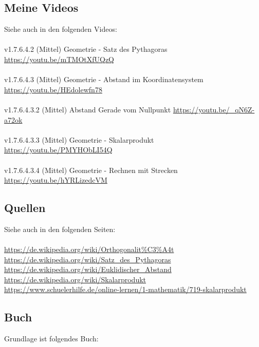 \documentclass[a4paper]{amsart}
\theoremstyle{definition}
\begin{document}
\subsection*{Meine Videos}
Siehe auch in den folgenden Videos:\\
\\
v1.7.6.4.2 (Mittel) Geometrie - Satz des Pythagoras\\
\url{https://youtu.be/mTMOtXfUQzQ}\\
\\
v1.7.6.4.3 (Mittel) Geometrie - Abstand im Koordinatensystem\\
\url{https://youtu.be/HEdolewfn78}
\\
\\v1.7.6.4.3.2 (Mittel) Abstand Gerade vom Nullpunkt
\url{https://youtu.be/_qN6Z-a72ok}
\\
\\v1.7.6.4.3.3 (Mittel) Geometrie - Skalarprodukt
\url{https://youtu.be/PMYHObLI54Q}
\\
\\v1.7.6.4.3.4 (Mittel) Geometrie - Rechnen mit Strecken
\url{https://youtu.be/hYRLizedcVM}

\subsection*{Quellen}
Siehe auch in den folgenden Seiten:\\
\\
\url{https://de.wikipedia.org/wiki/Orthogonalit%C3%A4t}\\
\url{https://de.wikipedia.org/wiki/Satz_des_Pythagoras}\\
\url{https://de.wikipedia.org/wiki/Euklidischer_Abstand}\\
\url{https://de.wikipedia.org/wiki/Skalarprodukt}\\
\url{https://www.schuelerhilfe.de/online-lernen/1-mathematik/719-skalarprodukt}

\subsection*{Buch}
Grundlage ist folgendes Buch:\\
\end{document}
